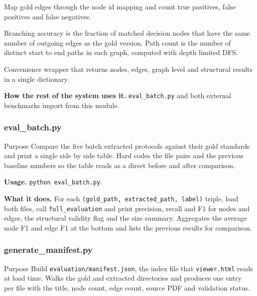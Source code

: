 \documentclass{article}
\begin{document}
\begin{description}[leftmargin=2em, style=nextline]
Map gold edges through the node id mapping and count true positives,
false positives and false negatives.
\item[\texttt{evaluate\_graph\_level(gold, extracted)}]
Branching accuracy is the fraction of matched decision nodes that
have the same number of outgoing edges as the gold version. Path
count is the number of distinct start to end paths in each graph,
computed with depth limited DFS.
\item[\texttt{full\_evaluation(gold, extracted)}]
Convenience wrapper that returns nodes, edges, graph level and
structural results in a single dictionary.
\end{description}

\textbf{How the rest of the system uses it.}
\texttt{eval\_batch.py} and both external benchmarks import from this
module.

\subsubsection{eval\_batch.py}

\begin{codeconceptbox}{Purpose}
Compare the five batch extracted protocols against their gold
standards and print a single side by side table. Hard codes the file
pairs and the previous baseline numbers so the table reads as a
direct before and after comparison.
\end{codeconceptbox}

\textbf{Usage.} \texttt{python eval\_batch.py}.

\textbf{What it does.} For each \texttt{(gold\_path, extracted\_path,
label)} triple, load both files, call \texttt{full\_evaluation} and
print precision, recall and F1 for nodes and edges, the structural
validity flag and the size summary. Aggregates the average node F1
and edge F1 at the bottom and lists the previous results for
comparison.

\subsubsection{generate\_manifest.py}

\begin{codeconceptbox}{Purpose}
Build \texttt{evaluation/manifest.json}, the index file that
\texttt{viewer.html} reads at load time. Walks the gold and extracted
directories and produces one entry per file with the title, node
count, edge count, source PDF and validation status.
\end{codeconceptbox}
\end{document}

